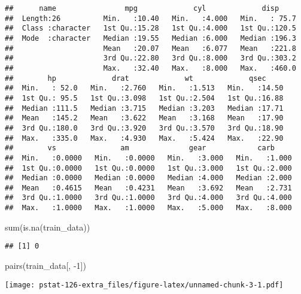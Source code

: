 \documentclass[
]{article}
\newenvironment{Shaded}{\begin{snugshade}}{\end{snugshade}}
\newcommand{\DecValTok}[1]{\textcolor[rgb]{0.00,0.00,0.81}{#1}}
\newcommand{\FunctionTok}[1]{\textcolor[rgb]{0.00,0.00,0.00}{#1}}
\newcommand{\NormalTok}[1]{#1}
\newcommand{\SpecialCharTok}[1]{\textcolor[rgb]{0.00,0.00,0.00}{#1}}
\begin{document}
\begin{verbatim}
##      name                mpg             cyl             disp      
##  Length:26          Min.   :10.40   Min.   :4.000   Min.   : 75.7  
##  Class :character   1st Qu.:15.28   1st Qu.:4.000   1st Qu.:120.5  
##  Mode  :character   Median :19.55   Median :6.000   Median :196.3  
##                     Mean   :20.07   Mean   :6.077   Mean   :221.8  
##                     3rd Qu.:22.80   3rd Qu.:8.000   3rd Qu.:303.2  
##                     Max.   :32.40   Max.   :8.000   Max.   :460.0  
##        hp             drat             wt             qsec      
##  Min.   : 52.0   Min.   :2.760   Min.   :1.513   Min.   :14.50  
##  1st Qu.: 95.5   1st Qu.:3.098   1st Qu.:2.504   1st Qu.:16.88  
##  Median :111.5   Median :3.715   Median :3.203   Median :17.71  
##  Mean   :145.2   Mean   :3.622   Mean   :3.168   Mean   :17.90  
##  3rd Qu.:180.0   3rd Qu.:3.920   3rd Qu.:3.570   3rd Qu.:18.90  
##  Max.   :335.0   Max.   :4.930   Max.   :5.424   Max.   :22.90  
##        vs               am              gear            carb      
##  Min.   :0.0000   Min.   :0.0000   Min.   :3.000   Min.   :1.000  
##  1st Qu.:0.0000   1st Qu.:0.0000   1st Qu.:3.000   1st Qu.:2.000  
##  Median :0.0000   Median :0.0000   Median :4.000   Median :2.000  
##  Mean   :0.4615   Mean   :0.4231   Mean   :3.692   Mean   :2.731  
##  3rd Qu.:1.0000   3rd Qu.:1.0000   3rd Qu.:4.000   3rd Qu.:4.000  
##  Max.   :1.0000   Max.   :1.0000   Max.   :5.000   Max.   :8.000
\end{verbatim}

\begin{Shaded}
\begin{Highlighting}[]
\FunctionTok{sum}\NormalTok{(}\FunctionTok{is.na}\NormalTok{(train\_data))}
\end{Highlighting}
\end{Shaded}

\begin{verbatim}
## [1] 0
\end{verbatim}

\begin{Shaded}
\begin{Highlighting}[]
\FunctionTok{pairs}\NormalTok{(train\_data[, }\SpecialCharTok{{-}}\DecValTok{1}\NormalTok{])}
\end{Highlighting}
\end{Shaded}

\texttt{[image: pstat-126-extra\_files/figure-latex/unnamed-chunk-3-1.pdf]}
\end{document}
